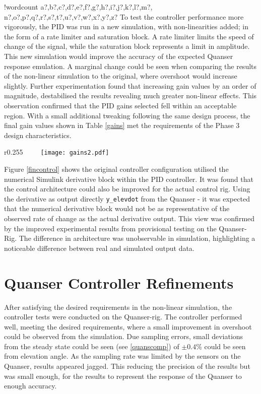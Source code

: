 \documentclass[11pt]{article}
\newcounter{words}
\newenvironment{counted}{%
  \setcounter{words}{0}
  \SearchList!{wordcount}{\stepcounter{words}}
    {a?,b?,c?,d?,e?,f?,g?,h?,i?,j?,k?,l?,m?,
    n?,o?,p?,q?,r?,s?,t?,u?,v?,w?,x?,y?,z?}
  \UndoBoundary{'}
  \SearchOrder{p;}}{%
  \StopSearching}
\begin{document}
\begin{counted}
To test the controller performance more vigorously, the PID was run in a
new simulation, with non-linearities added; in the form of a rate
limiter and saturation block. A rate limiter limits the speed of change
of the signal, while the saturation block represents a limit in
amplitude. This new simulation would improve the accuracy of the
expected Quanser response emulation. A marginal change could be seen
when comparing the results of the non-linear simulation to the original,
where overshoot would increase slightly. Further experimentation found
that increasing gain values by an order of magnitude, destabilised the
results revealing much greater non-linear effects. This observation
confirmed that the PID gains selected fell within an acceptable region.
With a small additional tweaking following the same design process, the
final gain values shown in Table \ref{gains} met the requirements of the
Phase 3 design characteristics.

\begin{wrapfigure}{r}{0.255\textwidth}
\vspace{-30pt}
 \centering
 \texttt{[image: gains2.pdf]}
 \label{gains}
\vspace{-20pt}
 \end{wrapfigure}

Figure \ref{fincontrol} shows the original controller configuration
utilised the numerical Simulink derivative block within the PID
controller. It was found that the control architecture could also be
improved for the actual control rig. Using the derivative as output
directly \texttt{y\_elevdot} from the Quanser - it was expected that the
numerical derivative block would not be as representative of the
observed rate of change as the actual derivative output. This view was
confirmed by the improved experimental results from provisional testing
on the Quanser-Rig. The difference in architecture was unobservable in
simulation, highlighting a noticeable difference between real and
simulated output data.

\section{Quanser Controller
Refinements}\label{quanser-controller-refinements}

After satisfying the desired requirements in the non-linear simulation,
the controller tests were conducted on the Quanser-rig. The controller
performed well, meeting the desired requirements, where a small
improvement in overshoot could be observed from the simulation. Due
sampling errors, small deviations from the steady state could be seen
(see \ref{quanscomp}) of \(\pm 0.4\)\% could be seen from elevation
angle. As the sampling rate was limited by the sensors on the Quanser,
results appeared jagged. This reducing the precision of the results but
was small enough, for the results to represent the response of the
Quanser to enough accuracy.


\end{counted}
\end{document}
